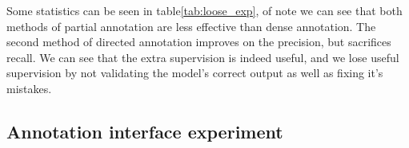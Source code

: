 \documentclass{article}
\begin{document}
Some statistics can be seen in table\ref{tab:loose_exp}, of note we can see that both methods of partial annotation are less effective than dense annotation. The second method of directed annotation improves on the precision, but sacrifices recall. We can see that the extra supervision is indeed useful, and we lose useful supervision by not validating the model's correct output as well as fixing it's mistakes.


\begin{table}[h]
  \centering
    \caption{Statistics from re-annotation test set}

\noindent{}

\label{tab:loose_exp}
\end{table}






\subsection {Annotation interface experiment}
\end{document}
